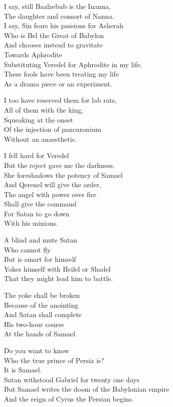 \documentclass[
]{book}
\begin{document}
I say, still Baalzebub is the Inanna,\\
The daughter and consort of Nanna.\\
I say, Sin fears his passions for Asherah\\
Who is Bel the Great of Babylon\\
And chooses instead to gravitate\\
Towards Aphrodite\\
Substituting Veredel for Aphrodite in my life.\\
These fools have been treating my life\\
As a drama piece or an experiment.

I too have reserved them for lab rats,\\
All of them with the king,\\
Squeaking at the onset\\
Of the injection of pancuronium\\
Without an anaesthetic.

I fell hard for Veredel\\
But the reject gave me the darkness.\\
She foreshadows the potency of Samael\\
And Qerenel will give the order,\\
The angel with power over fire\\
Shall give the command\\
For Satan to go down\\
With his minions.

A blind and mute Satan\\
Who cannot fly\\
But is smart for himself\\
Yokes himself with Heilel or Shadel\\
That they might lead him to battle.

The yoke shall be broken\\
Because of the anointing\\
And Satan shall complete\\
His two-hour course\\
At the hands of Samael.

Do you want to know\\
Who the true prince of Persia is?\\
It is Samael.\\
Satan withstood Gabriel for twenty one days\\
But Samael writes the doom of the Babylonian empire\\
And the reign of Cyrus the Persian begins.
\end{document}
